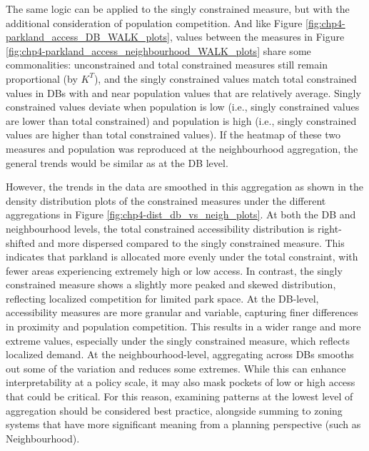 \documentclass[
11pt, %
oneside, %
english, %
singlespacing, %
]{macthesis} %
\begin{document}
The same logic can be applied to the singly constrained measure, but with the additional consideration of population competition. And like Figure \ref{fig:chp4-parkland_access_DB_WALK_plots}, values between the measures in Figure \ref{fig:chp4-parkland_access_neighbourhood_WALK_plots} share some commonalities: unconstrained and total constrained measures still remain proportional (by \(K^T\)), and the singly constrained values match total constrained values in DBs with and near population values that are relatively average. Singly constrained values deviate when population is low (i.e., singly constrained values are lower than total constrained) and population is high (i.e., singly constrained values are higher than total constrained values). If the heatmap of these two measures and population was reproduced at the neighbourhood aggregation, the general trends would be similar as at the DB level.

However, the trends in the data are smoothed in this aggregation as shown in the density distribution plots of the constrained measures under the different aggregations in Figure \ref{fig:chp4-dist_db_vs_neigh_plots}. At both the DB and neighbourhood levels, the total constrained accessibility distribution is right-shifted and more dispersed compared to the singly constrained measure. This indicates that parkland is allocated more evenly under the total constraint, with fewer areas experiencing extremely high or low access. In contrast, the singly constrained measure shows a slightly more peaked and skewed distribution, reflecting localized competition for limited park space. At the DB-level, accessibility measures are more granular and variable, capturing finer differences in proximity and population competition. This results in a wider range and more extreme values, especially under the singly constrained measure, which reflects localized demand. At the neighbourhood-level, aggregating across DBs smooths out some of the variation and reduces some extremes. While this can enhance interpretability at a policy scale, it may also mask pockets of low or high access that could be critical. For this reason, examining patterns at the lowest level of aggregation should be considered best practice, alongside summing to zoning systems that have more significant meaning from a planning perspective (such as Neighbourhood).
\end{document}
